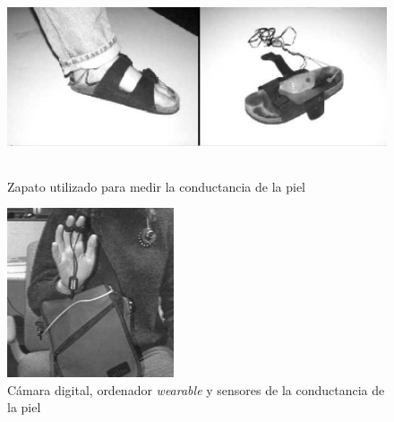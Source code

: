 \begin{figure}[]
   \begin{minipage}{0.48\textwidth}
     \centering
     \includegraphics[width=.7\linewidth, height=5cm]{Imagenes/w3}
     \caption{Zapato utilizado para medir la conductancia de la piel}
     \label{fig:w3}
   \end{minipage}\hfill
   \begin {minipage}{0.48\textwidth}
     \centering
     \includegraphics[width=.7\linewidth, height=5cm]{Imagenes/w4}
     \caption{Cámara digital, ordenador \textit{wearable} y sensores de la conductancia de la piel}
     \label{fig:w4}
   \end{minipage}
\end{figure}

